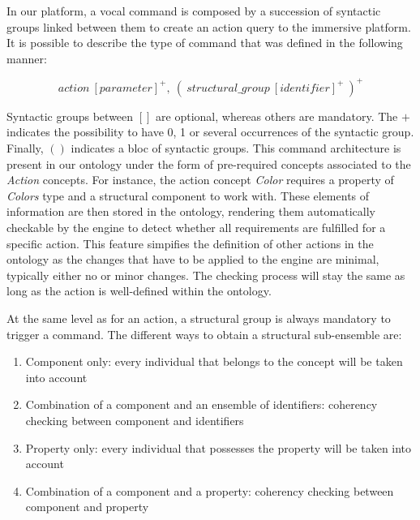 \documentclass{vgtc}                          %
\begin{document}
In our platform, a vocal command is composed by a succession of syntactic groups linked between them to create an action query to the immersive platform. It is possible to describe the type of command that was defined in the following manner:

$$action\ [parameter]^+,\ (\ structural\_group\ [identifier]^+\ )^+$$

Syntactic groups between $[]$ are optional, whereas others are mandatory. The $+$ indicates the possibility to have 0, 1 or several occurrences of the syntactic group. Finally, $()$ indicates a bloc of syntactic groups. This command architecture is present in our ontology under the form of pre-required concepts associated to the \textit{Action} concepts. For instance, the action concept \textit{Color} requires a property of \textit{Colors} type and a structural component to work with. These elements of information are then stored in the ontology, rendering them automatically checkable by the engine to detect whether all requirements are fulfilled for a specific action. This feature simpifies the definition of other actions in the ontology as the changes that have to be applied to the engine are minimal, typically either no or minor changes. The checking process will stay the same as long as the action is well-defined within the ontology.

At the same level as for an action, a structural group is always mandatory to trigger a command. The different ways to obtain a structural sub-ensemble are:

\begin{enumerate}
  \item Component only: every individual that belongs to the concept will be taken into account
  \item Combination of a component and an ensemble of identifiers: coherency checking between component and identifiers 
  \item Property only: every individual that possesses the property will be taken into account
  \item Combination of a component and a property: coherency checking between component and property
\end{enumerate}
\end{document}
